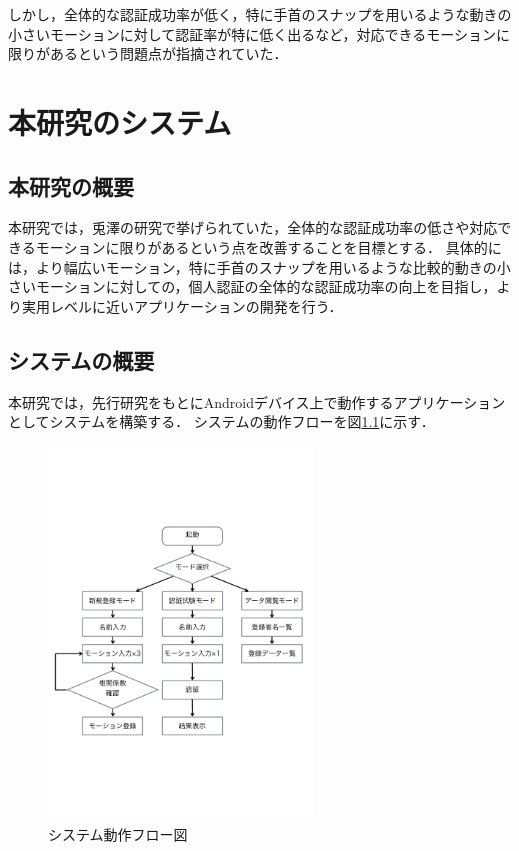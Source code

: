 \documentclass[11pt]{jreport}
\begin{document}
    しかし，全体的な認証成功率が低く，特に手首のスナップを用いるような動きの小さいモーションに対して認証率が特に低く出るなど，対応できるモーションに限りがあるという問題点が指摘されていた．

\chapter{本研究のシステム}
	\section{本研究の概要}
	本研究では，兎澤の研究で挙げられていた，全体的な認証成功率の低さや対応できるモーションに限りがあるという点を改善することを目標とする．
    具体的には，より幅広いモーション，特に手首のスナップを用いるような比較的動きの小さいモーションに対しての，個人認証の全体的な認証成功率の向上を目指し，より実用レベルに近いアプリケーションの開発を行う．

	\section{システムの概要}
	本研究では，先行研究をもとにAndroidデバイス上で動作するアプリケーションとしてシステムを構築する．
    システムの動作フローを図\ref{flow}に示す．

    \begin{figure}[htbp]
        \begin{center}
            \includegraphics[width=7cm, bb=0 183 594 670]{Flow.pdf}
            \caption{システム動作フロー図}
            \label{flow}
        \end{center}
    \end{figure}
\end{document}
